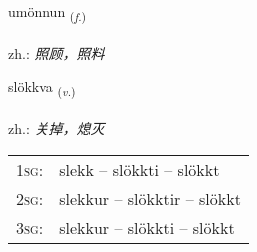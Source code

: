 \documentclass[frontgrid, backgrid]{flacards}\usepackage[]{graphicx}\usepackage[]{xcolor}
\begin{document}
\renewcommand{\flhead}{\vskip5pt \fboxsep=0pt {\small\bfseries\footnotesize Nafnorð | 名词}}
\renewcommand{\fcfoot}{\vskip5pt \fboxsep=0pt \hspace{2pt}{\small\bfseries\footnotesize 3K}}

\renewcommand{\blhead}{\vskip5pt {\small\bfseries\footnotesize Nafnorð | 名词 }}
\renewcommand{\bcfoot}{\vskip5pt \hspace{2pt}{\small\bfseries\footnotesize 3K}}


{umönnun \small{\textsubscript{(\textit{f.})}} \\[1ex] %
\textphonetic{[ʏmœnʏn]} \\
zh.: \emph{照顾，照料} \\  [2ex]
\renewcommand*{\arraystretch}{0.8}
}

\renewcommand{\flhead}{\vskip5pt \fboxsep=0pt {\small\bfseries\footnotesize Sagnorð | 动词}}
\renewcommand{\fcfoot}{\vskip5pt \fboxsep=0pt \hspace{2pt}{\small\bfseries\footnotesize 3K}}

\renewcommand{\blhead}{\vskip5pt {\small\bfseries\footnotesize Sagnorð | 动词 }}
\renewcommand{\bcfoot}{\vskip5pt \hspace{2pt}{\small\bfseries\footnotesize 3K}}


{slökkva \small{\textsubscript{(\textit{v.})}} \\[1ex] %
\textphonetic{[stlœhkva]} \\
zh.: \emph{关掉，熄灭} \\  [2ex]
\renewcommand*{\arraystretch}{0.8}
\begin{tabular}{p{1cm}l}
\textsc{1sg}: & slekk -- slökkti -- slökkt \\ 
\textsc{2sg}: & slekkur -- slökktir -- slökkt \\ 
\textsc{3sg}: & slekkur -- slökkti -- slökkt \\ 
\end{tabular}
}
\end{document}
